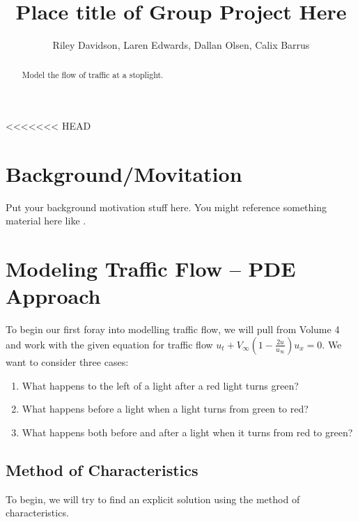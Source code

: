 \documentclass[12pt]{article}
\begin{document}
<<<<<<< HEAD

\title{Place title of Group Project Here}
\author{Riley Davidson, Laren Edwards, Dallan Olsen, Calix Barrus}

\date{}

\maketitle

\begin{abstract}
Model the flow of traffic at a stoplight. 
\end{abstract}

\section{Background/Movitation}
Put your background motivation stuff here. You might reference something material here like \cite{ref1}.

\section{Modeling Traffic Flow – PDE Approach}

To begin our first foray into modelling traffic flow, we will pull from Volume 4 and work with the given equation for traffic flow $u_t + V_\infty \left(1 - \frac{2u}{u_{\infty}} \right) u_x = 0$. We want to consider three cases:
\begin{enumerate}
    \item What happens to the left of a light after a red light turns green?
    \item What happens before a light when a light turns from green to red? 
    \item What happens both before and after a light when it turns from red to green?
\end{enumerate}

\subsection{Method of Characteristics} 
To begin, we will try to find an explicit solution using the method of characteristics. 
\end{document}
